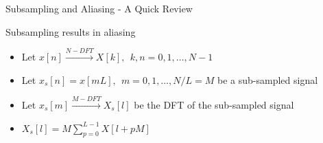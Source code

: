 	\begin{frame}{Subsampling and Aliasing - A Quick Review}
\begin{block}{Subsampling results in aliasing}
\begin{itemize}
  \item Let $x[n] \xrightarrow{N-DFT} X[k] , \ \ k,n = 0,1, \ldots,N-1$
  \item Let $x_{s}[n]  = x[mL] , \ \ m = 0,1, \ldots, N/L=M$ be a sub-sampled signal
  \item Let $x_s[m] \xrightarrow{M-DFT} X_s[l]$ be the DFT of the sub-sampled signal
  \item $\boxed{X_s[l] = M\sum\limits_{p=0}^{L-1}X[l+pM]}$
\end{itemize}
\end{block}
%		
%			
%			
	\end{frame}

